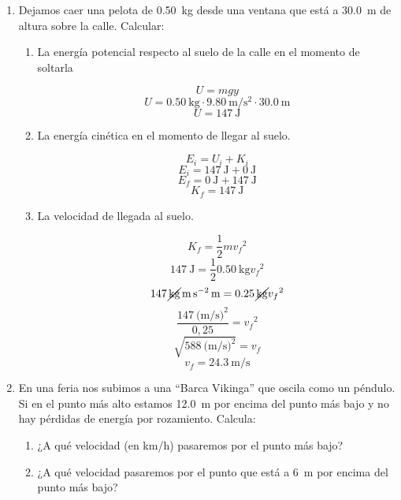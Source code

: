 \documentclass[Física - Práctica.root.tex]{subfiles}
\begin{document}
\begin{enumerate}
  \item Dejamos caer una pelota de \SI{0,50}{\kilo\gram} desde una ventana que está a \SI{30,0}{\meter} de altura sobre
        la calle. Calcular:
        \begin{enumerate}
          \item La energía potencial respecto al suelo de la calle en el momento de soltarla
                \begin{center}
                  \[ U = mgy \]
                  \[ U = \SI{0,50}{\kilo\gram}\cdot\SI{9,80}{\m\per\s\squared}\cdot\SI{30,0}{\meter} \]
                  \[ \boxed{U = \SI{147}{\joule}} \]
                \end{center}
          \item La energía cinética en el momento de llegar al suelo.
                \begin{center}
                  \[ E_i = U_i + K_i \]
                  \[ E_i = \SI{147}{\joule} + \SI{0}{\joule} \]
                  \[ E_f = \SI{0}{\joule} + \SI{147}{\joule} \]
                  \[ \boxed{K_f = \SI{147}{\joule}} \]
                \end{center}
          \item La velocidad de llegada al suelo.
                \begin{center}
                  \[ K_f = \frac{1}{2}m{v_f}^2 \]
                  \[ \SI{147}{\joule} = \frac{1}{2}\SI{0,50}{\kilo\gram}{v_f}^2 \]
                  \[ \SI{147}{\cancel\kilo\gram\m\per\s\squared\m} = \SI{0,25}{\cancel\kilo\gram}{v_f}^2 \]
                  \[ \frac{\SI{147}{(\m\per\s)^2}}{0,25} = {v_f}^2 \]
                  \[ \sqrt{\SI{588}{(\m\per\s)^2}} = v_f \]
                  \[ \boxed{v_f = \SI{24,3}{\m\per\s}} \]
                \end{center}
        \end{enumerate}

  \item En una feria nos subimos a una “Barca Vikinga” que oscila como un péndulo. Si en el
        punto más alto estamos \SI{12,0}{\meter} por encima del punto más bajo y no hay pérdidas de
        energía por rozamiento. Calcula:
        \begin{enumerate}
          \item ¿A qué velocidad (en \si{\km/\hour}) pasaremos por el punto más bajo?
          \item ¿A qué velocidad pasaremos por el punto que está a \SI{6}{\meter} por encima del punto más bajo?
        \end{enumerate}


\end{enumerate}
\end{document}
